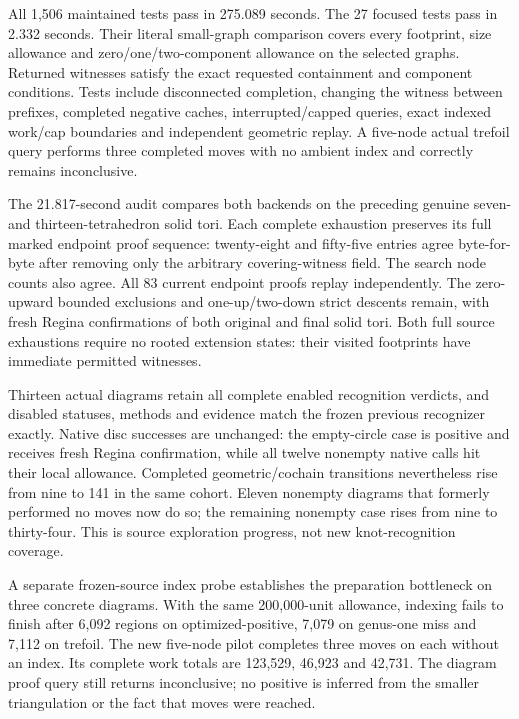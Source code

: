 All 1,506 maintained tests pass in 275.089 seconds. The 27 focused tests
pass in 2.332 seconds. Their literal small-graph comparison covers every
footprint, size allowance and zero/one/two-component allowance on the selected
graphs. Returned witnesses satisfy the exact requested containment and
component conditions. Tests include disconnected completion, changing the
witness between prefixes, completed negative caches, interrupted/capped
queries, exact indexed work/cap boundaries and independent geometric replay.
A five-node actual trefoil query performs three completed moves with no
ambient index and correctly remains inconclusive.

The 21.817-second audit compares both backends on the preceding genuine
seven- and thirteen-tetrahedron solid tori. Each complete exhaustion preserves
its full marked endpoint proof sequence: twenty-eight and fifty-five entries
agree byte-for-byte after removing only the arbitrary covering-witness field.
The search node counts also agree. All 83 current endpoint proofs replay
independently. The zero-upward bounded exclusions and one-up/two-down strict
descents remain, with fresh Regina confirmations of both original and final
solid tori. Both full source exhaustions require no rooted extension states:
their visited footprints have immediate permitted witnesses.

Thirteen actual diagrams retain all complete enabled recognition verdicts,
and disabled statuses, methods and evidence match the frozen previous
recognizer exactly. Native disc successes are unchanged: the empty-circle
case is positive and receives fresh Regina confirmation, while all twelve
nonempty native calls hit their local allowance. Completed geometric/cochain
transitions nevertheless rise from nine to 141 in the same cohort. Eleven
nonempty diagrams that formerly performed no moves now do so; the remaining
nonempty case rises from nine to thirty-four. This is source exploration
progress, not new knot-recognition coverage.

A separate frozen-source index probe establishes the preparation bottleneck
on three concrete diagrams. With the same 200,000-unit allowance, indexing
fails to finish after 6,092 regions on optimized-positive, 7,079 on genus-one
miss and 7,112 on trefoil. The new five-node pilot completes three moves on
each without an index. Its complete work totals are 123,529, 46,923 and
42,731. The diagram proof query still returns inconclusive; no positive is
inferred from the smaller triangulation or the fact that moves were reached.

